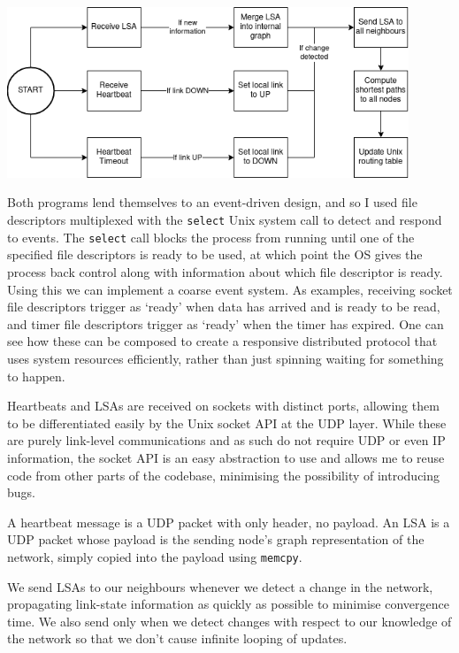 \documentclass[withindex,glossary,openany]{cam-thesis}
\begin{document}
\begin{center}
\begin{minipage}{0.9\textwidth} \centering
	\includegraphics[width=0.9\textwidth]{flowchart_lsr}
	\label{fig:flowchart_lsr}
\end{minipage}
\end{center}

Both programs lend themselves to an event-driven design, and so I used file descriptors multiplexed with the \texttt{select} Unix system call to detect and respond to events. The \texttt{select} call blocks the process from running until one of the specified file descriptors is ready to be used, at which point the OS gives the process back control along with information about which file descriptor is ready. Using this we can implement a coarse event system. As examples, receiving socket file descriptors trigger as `ready' when data has arrived and is ready to be read, and timer file descriptors trigger as `ready' when the timer has expired. One can see how these can be composed to create a responsive distributed protocol that uses system resources efficiently, rather than just spinning waiting for something to happen.

Heartbeats and LSAs are received on sockets with distinct ports, allowing them to be differentiated easily by the Unix socket API at the UDP layer. While these are purely link-level communications and as such do not require UDP or even IP information, the socket API is an easy abstraction to use and allows me to reuse code from other parts of the codebase, minimising the possibility of introducing bugs.

A heartbeat message is a UDP packet with only header, no payload. An LSA is a UDP packet whose payload is the sending node's graph representation of the network, simply copied into the payload using \texttt{memcpy}.

We send LSAs to our neighbours whenever we detect a change in the network, propagating link-state information as quickly as possible to minimise convergence time. We also send only when we detect changes with respect to our knowledge of the network so that we don't cause infinite looping of updates.
\end{document}
